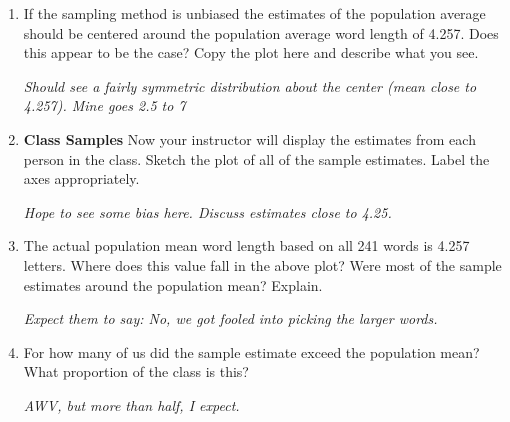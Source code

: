 \begin{enumerate}
     \item  If the sampling method is unbiased the estimates of the
       population average should be centered around the population
       average word length of 4.257.  Does this appear to be the case?
        Copy the plot here and describe what you see.       
\begin{students}
  \vspace{3cm}
\end{students}    
\begin{key}
   {\it Should see a fairly symmetric distribution about the center
     (mean close to 4.257).  Mine goes 2.5 to 7}
\end{key}



     \item\label{classPlot} {\bf Class Samples} Now your instructor will
       display the  estimates from each person in the class. 
        Sketch the plot of all of the sample estimates. 
        Label the axes appropriately.       
\begin{students}
  \vspace{4cm}
\end{students}    
\begin{key}
   {\it Hope to see some bias here.  Discuss estimates close to 4.25.}
\end{key}

      \item  The actual population mean word length based on all 241
        words is 4.257 letters. Where does this value fall in the
        above plot? Were most of the sample estimates around the
        population mean? Explain. 
\begin{students}
  \vspace{1cm}
\end{students}    
\begin{key}
   {\it Expect them to say: No, we got fooled into picking the larger words.}
\end{key}     

     \item\label{medUnbiased} For how many of us did the sample
       estimate exceed the population mean? What proportion of the
       class is this?        
\begin{students}
  \vspace{1cm}
\end{students}    
\begin{key}
   {\it AWV, but more than half, I expect.}
\end{key}


\end{enumerate}
